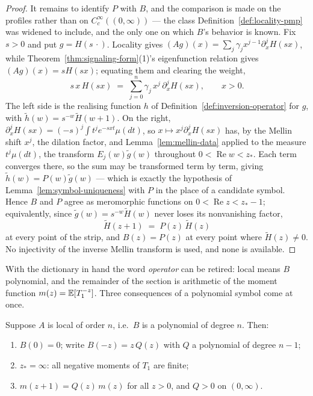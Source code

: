 \begin{proof}
It remains to identify $P$ with $B$, and the comparison is made on the profiles rather than on
$C_c^\infty((0,\infty))$ --- the class Definition~\ref{def:locality-pmp} was widened to
include, and the only one on which $B$'s behavior is known. Fix $s > 0$ and put
$g = H(s\,\cdot)$. Locality gives $(Ag)(x) = \sum_j \gamma_j x^{j-1}\partial_x^j H(sx)$, while
Theorem~\ref{thm:signaling-form}(1)'s eigenfunction relation gives $(Ag)(x) = sH(sx)$; equating
them and clearing the weight,
\[
  s\,x\,H(sx) \;=\; \sum_{j=0}^{n} \gamma_j\, x^{j}\,\partial_x^{j} H(sx),
  \qquad x > 0 .
\]
The left side is the realising function $h$ of Definition~\ref{def:inversion-operator} for
$g$, with $\tilde h(w) = s^{-w}\tilde H(w+1)$. On the right, $\partial_x^j H(sx) = (-s)^j\int t^j
e^{-sxt}\mu(dt)$, so $x \mapsto x^j\partial_x^j H(sx)$ has, by the Mellin shift $x^j$, the
dilation factor, and Lemma~\ref{lem:mellin-data} applied to the measure $t^j\mu(dt)$, the
transform $E_j(w)\tilde g(w)$ throughout $0 < \operatorname{Re} w < z_*$. Each term converges
there, so the sum may be transformed term by term, giving $\tilde h(w) = P(w)\tilde g(w)$ ---
which is exactly the hypothesis of Lemma~\ref{lem:symbol-uniqueness} with $P$ in the place of a
candidate symbol. Hence $B$ and $P$ agree as meromorphic functions on
$0 < \operatorname{Re} z < z_*-1$; equivalently, since $\tilde g(w) = s^{-w}\tilde H(w)$ never
loses its nonvanishing factor,
\[
  \tilde H(z+1) \;=\; P(z)\,\tilde H(z)
\]
at every point of the strip, and $B(z) = P(z)$ at every point where $\tilde H(z) \ne 0$. No
injectivity of the inverse Mellin transform is used, and none is available.
\end{proof}

With the dictionary in hand the word \emph{operator} can be retired: local means $B$
polynomial, and the remainder of the section is arithmetic of the moment function
$m(z) = \mathbb{E}[T_1^{-z}]$. Three consequences of a polynomial symbol come at once.

\begin{lemma}\label{lem:moment-recursion}
Suppose $A$ is local of order $n$, i.e.\ $B$ is a polynomial of degree $n$. Then:
\begin{enumerate}
\item $B(0) = 0$; write $B(-z) = z\,Q(z)$ with $Q$ a polynomial of degree $n - 1$;
\item $z_* = \infty$: all negative moments of $T_1$ are finite;
\item $m(z+1) = Q(z)\,m(z)$ for all $z > 0$, and $Q > 0$ on $(0,\infty)$.
\end{enumerate}
\end{lemma}

